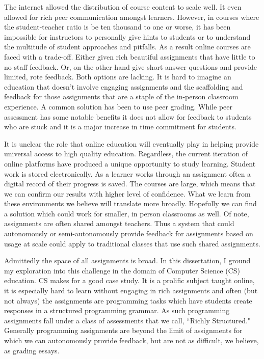 The internet allowed the distribution of course content to scale well. It even allowed for rich peer communication amongst learners. However, in courses where the student-teacher ratio is be ten thousand to one or worse, it has been impossible for instructors to personally give hints to students or to understand the multitude of student approaches and pitfalls. As a result online courses are faced with a trade-off. Either given rich beautiful assignments that have little to no staff feedback. Or, on the other hand give short answer questions and provide limited, rote feedback. Both options are lacking. It is hard to imagine an education that doesn't involve engaging assignments and the scaffolding and feedback for those assignments that are a staple of the in-person classroom experience. A common solution has been to use peer grading. While peer assessment has some notable benefits it does not allow for feedback to students who are stuck and it is a major increase in time commitment for students.

It is unclear the role that online education will eventually play in helping provide universal access to high quality education. Regardless, the current iteration of online platforms have produced a unique opportunity to study learning. Student work is stored electronically. As a learner works through an assignment often a digital record of their progress is saved. The courses are large, which means that we can confirm our results with higher level of confidence. What we learn from these environments we believe will translate more broadly. Hopefully we can find a solution which could work for smaller, in person classrooms as well. Of note, assignments are often shared amongst teachers. Thus a system that could autonomously or semi-autonomously provide feedback for assignments based on usage at scale could apply to traditional classes that use such shared assignments.

Admittedly the space of all assignments is broad. In this dissertation, I ground my exploration into this challenge in the domain of Computer Science (CS) education. CS makes for a good case study. It is a prolific subject taught online, it is especially hard to learn without engaging in rich assignments and often (but not always) the assignments are programming tasks which have students create responses in a structured programming grammar. As such programming assignments fall under a class of assessments that we call, ``Richly Structured." Generally programming assignments are beyond the limit of assignments for which we can autonomously provide feedback, but are not as difficult, we believe, as grading essays.

